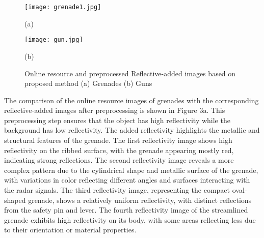 \documentclass[journal,article,submit,pdftex,moreauthors]{Definitions/mdpi}
\begin{document}
\begin{figure}[h]
    \centering
    \begin{minipage}{0.49\textwidth}
        \centering
        \texttt{[image: grenade1.jpg]}
        \centering
        \caption*{(a)}
    \end{minipage}
    \hfill
    \begin{minipage}{0.49\textwidth}
        \centering
        \texttt{[image: gun.jpg]}
        \caption*{(b)}
    \end{minipage}
    \caption{Online resource and preprocessed Reflective-added images based on proposed method (a) Grenades    (b) Guns}
    \label{fig:side_by_side}
\end{figure}







The comparison of the online resource images of grenades with the corresponding reflective-added images after preprocessing is shown in Figure 3a. This preprocessing step ensures that the object has high reflectivity while the background has low reflectivity. The added reflectivity highlights the metallic and structural features of the grenade. The first reflectivity image shows high reflectivity on the ribbed surface, with the grenade appearing mostly red, indicating strong reflections. The second reflectivity image reveals a more complex pattern due to the cylindrical shape and metallic surface of the grenade, with variations in color reflecting different angles and surfaces interacting with the radar signals. The third reflectivity image, representing the compact oval-shaped grenade, shows a relatively uniform reflectivity, with distinct reflections from the safety pin and lever. The fourth reflectivity image of the streamlined grenade exhibits high reflectivity on its body, with some areas reflecting less due to their orientation or material properties.
\end{document}
